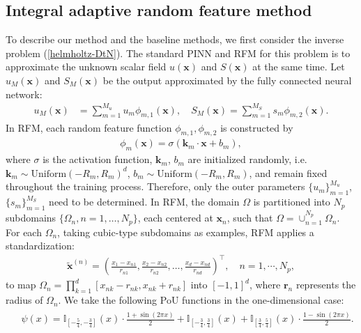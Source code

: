 \documentclass{article}
\theoremstyle{plain}
\theoremstyle{definition}
\newcounter{example}[section]         %
\begin{document}
\subsection{Integral adaptive random feature method}
To describe our method and the baseline methods, we first consider the inverse problem (\ref{helmholtz-DtN}). 
The standard PINN and RFM for this problem is to approximate the unknown scalar field $u(\boldsymbol{x})$ and $S(\boldsymbol{x})$ at the same time.
Let $u_{M}(\boldsymbol{x})$ and $S_{M}(\boldsymbol{x})$ be the output approximated by the fully connected neural network:
\begin{align}\label{approximation function}
    u_{M}(\boldsymbol{x})&=\sum_{m=1}^{M_u} u_{m} \phi_{m,1}(\boldsymbol{x}), \quad    S_{M}(\boldsymbol{x})=\sum_{m=1}^{M_S} s_{m}\phi_{m,2}(\boldsymbol{x}).
\end{align}
In RFM, each random feature function $\phi_{m,1}, \phi_{m,2}$ is constructed by
\begin{align}
\label{activation funtion}
\phi_{m}(\boldsymbol{x})= \sigma(\boldsymbol{k}_m\cdot \boldsymbol{x}+b_m),
\end{align}
where $\sigma$ is the activation function,   {$\boldsymbol{k}_m$, $b_m$ are initialized randomly, i.e.  $\boldsymbol{k}_m \sim \text{Uniform}(-R_m, R_m)^d$,  $b_m \sim \text{Uniform}(-R_m, R_m)$, and remain fixed throughout the training process}.  {Therefore,  only the outer parameters $\{u_m\}_{m=1}^{M_u}$, $\{s_m\}_{m=1}^{M_S}$ } need to be determined. In RFM, the domain $\Omega$ is partitioned into $N_p$ subdomains $\{ \Omega_n, n=1,\ldots, N_p \}$, each centered at $\boldsymbol{x}_n$, such that $\Omega=\cup_{n=1}^{N_p}\Omega_n$. For each $\Omega_n$, taking cubic-type subdomains as examples, RFM applies a standardization:
\begin{align}
\tilde{\boldsymbol{x}}^{(n)}= {\left(\frac{x_1-x_{n1}}{r_{n1}},\frac{x_2-x_{n2}}{r_{n2}},\ldots,\frac{x_d-x_{nd}}{r_{nd}}\right)^\top},\quad n=1,\cdots,N_p,
\end{align}
to map  {$\Omega_n = \prod_{k=1}^d [x_{nk}-r_{nk}, x_{nk}+r_{nk}]$ into $[-1,1]^d$, where $\boldsymbol{r}_n$ represents the radius of $\Omega_n$}. We take the following PoU functions in the one-dimensional case:
\begin{align}
\label{PoU}
\begin{aligned}
&\psi(x)=\mathbb{I}_{\left[-\frac{5}{4},-\frac{3}{4}\right]}\left(x\right)\cdot\frac{1+\sin\left(2\pi x\right)}{2}+\mathbb{I}_{\left[-\frac{3}{4},\frac{3}{4}\right]}\left(x\right)+\mathbb{I}_{\left[\frac{3}{4},\frac{5}{4}\right]}\left(x\right)\cdot\frac{1-\sin\left(2\pi x\right)}{2}.\end{aligned}
\end{align}
\end{document}
